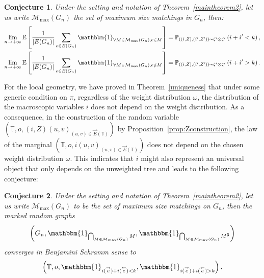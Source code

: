 \documentclass[11pt]{article}
\newtheorem{conj}{Conjecture}
\begin{document}
    \begin{conj}\label{conj:desirables}
        Under the setting and notation of Theorem~\ref{maintheorem2}, let us write $\mathcal{M}_{\max}(G_n)$ the set of maximum size matchings in $G_n$, then:
        \begin{equation}
            \begin{aligned}
                \lim_{n \rightarrow +\infty} \mathbb{E}\left[ \frac{1}{|E(G_n)|} \sum_{e \in E(G_n)} \mathbbm{1}_{\forall M \in \mathcal{M}_{\max}(G_n), e \in M}\right] = \mathbb{P}_{((i,Z),(i',Z'))\sim \zeta'\otimes\zeta'}\left( i+i'<k \right), \\
                \lim_{n \rightarrow +\infty} \mathbb{E}\left[ \frac{1}{|E(G_n)|} \sum_{e \in E(G_n)} \mathbbm{1}_{\forall M \in \mathcal{M}_{\max}(G_n), e \notin M}\right] = \mathbb{P}_{((i,Z),(i',Z'))\sim \zeta'\otimes\zeta'}\left( i+i'>k \right).
            \end{aligned}
        \end{equation}
    \end{conj}

\bigskip

For the local geometry, we have proved in Theorem~\ref{uniqueness} that under some generic condition on $\pi$, regardless of the weight distribution $\omega$, the distribution of the macroscopic variables $i$ does not depend on the weight distribution. As a consequence, in the construction of the random variable $\left( \mathbb{T},o,(i,Z)(u,v)_{(u,v)\in \overset{\rightarrow}{E}(\mathbb{T})} \right)$ by Proposition~\ref{prop:Zconstruction}, the law of the marginal $\left(\mathbb{T},o,i(u,v)_{(u,v) \in \overset{\rightarrow}{E}(\mathbb{T})} \right)$ does not depend on the chosen weight distribution $\omega$. This indicates that $i$ might also represent an universal object that only depends on the unweighted tree and leads to the following conjecture:
\begin{conj}\label{conj:desirablesgeom}
    Under the setting and notation of Theorem~\ref{maintheorem2}, let us write $\mathcal{M}_{\max}(G_n)$ to be the set of maximum size matchings on $G_n$, then the marked random graphs
    \[ \left(G_n,\mathbbm{1}_{\bigcap_{M \in \mathcal{M}_{\max}(G_n)}M},\mathbbm{1}_{\bigcap_{M \in \mathcal{M}_{\max}(G_n)}M^{\complement}}  \right)  \]
    converges in Benjamini Schramm sense to
    \[ \left(\mathbb{T},o,\mathbbm{1}_{i(\overset{\rightarrow}{e})+i(\overset{\leftarrow}{e})<k},\mathbbm{1}_{i(\overset{\rightarrow}{e})+i(\overset{\leftarrow}{e})>k} \right) . \]
\end{conj}
\end{document}
